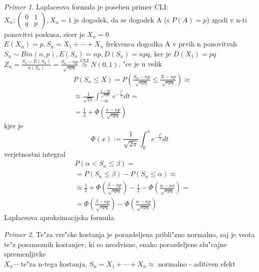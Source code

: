 \documentclass[a4paper,12pt]{article}
\theoremstyle{definition}
\theoremstyle{remark}
\newtheorem*{ex}{Primer}
\begin{document}
\begin{ex}
    Laplaceova formula je poseben primer CLI: \\
    $X_n: \begin{pmatrix}0 & 1 \\ q & p\end{pmatrix}, X_n = 1$ je dogodek, da se dogodek A (s $P(A) = p$) zgodi
    v n-ti ponovitvi poskusa, sicer je $X_n = 0$ \\
    $E(X_n) = p, S_n = X_1 + \cdots + X_n$ frekvenca dogodka A v prvih n ponovitvah \\
    $S_n \sim Bin(n,p), E(S_n) = np, D(S_n) = npq$, ker je $D(X_1) = pq$ \\
    $Z_n = \frac{S_n - E(S_n)}{\sigma(S_n)} = \frac{S_n - np}{\sqrt{npq}} \stackrel{\text{CLI}}{\approx} N(0,1)$,
    "ce je n velik \\
    \begin{align*}
        &P(S_n \leq X) = P(\frac{S_n - np}{\sqrt{npq}} \leq \frac{X - np}{\sqrt{npq}}) \approx \\
        &\approx \frac{1}{\sqrt{2\pi}} \int_{-\infty}^{\frac{x-np}{\sqrt{npq}}} e^{-\frac{t^2}{2}} dt = \\
        &= \frac{1}{2} + \Phi(\frac{x-np}{\sqrt{npq}})
    \end{align*}
    kjer je
    \begin{equation*}
        \Phi(x) := \frac{1}{\sqrt{2\pi}} \int_0^x e^{-\frac{t^2}{2}} dt
    \end{equation*}
    verjetnostni integral \\
    \begin{align*}
        &P(\alpha < S_n \leq \beta) = \\
        &= P(S_n \leq \beta) - P(S_n \leq \alpha) \approx \\
        &\approx \frac{1}{2} + \Phi(\frac{\beta - np}{\sqrt{npq}}) - \frac{1}{2} - \Phi(\frac{\alpha - no}{\sqrt{npq}}) = \\
        &= \Phi(\frac{\beta - np}{\sqrt{npq}}) - \Phi(\frac{\alpha - np}{\sqrt{npq}})
    \end{align*}
    Laplaceova aproksimacijska formula
\end{ex}

\begin{ex}
    Te"za vre"cke kostanja je porazdeljena pribli"zno normalno, saj je vsota te"z posameznih kostanjev, ki so neodvisne,
    enako porazdeljene slu"cajne spremenljivke \\
    $X_n \cdots$ te"za n-tega kostanja, $S_n = X_1 + \cdots + X_n \approx$ normalno - aditiven efekt
\end{ex}
\end{document}
